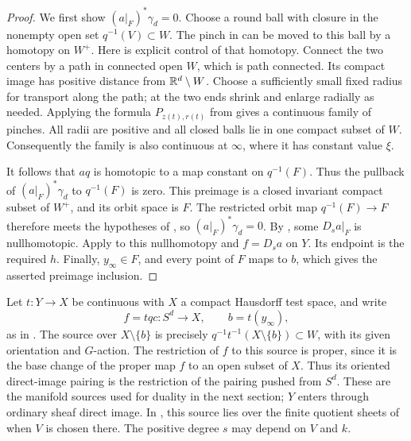 \begin{proof}
We first show $(a|_F)^*\gamma_d=0$.  Choose a round ball with
closure in the nonempty open set $q^{-1}(V)\subset W$.  The
pinch in  can be moved to this ball by a
homotopy on $W^+$.  Here is explicit control of that homotopy.
Connect the two centers by a path in connected open $W$, which
is path connected.  Its compact image has positive distance
from $\mathbb R^d\setminus W$.  Choose a sufficiently small fixed
radius for transport along the path; at the two ends shrink
and enlarge radially as needed.  Applying the formula
$P_{z(t),r(t)}$ from  gives a continuous
family of pinches.  All radii are positive and all closed balls
lie in one compact subset of $W$.  Consequently the family is
also continuous at $\infty$, where it has constant value $\xi$.

It follows that $aq$ is homotopic to a map constant on
$q^{-1}(F)$.  Thus the pullback of $(a|_F)^*\gamma_d$ to
$q^{-1}(F)$ is zero.  This preimage is a closed invariant compact
subset of $W^+$, and its orbit space is $F$.  The restricted orbit map
$q^{-1}(F)\to F$ therefore meets the hypotheses of
, so $(a|_F)^*\gamma_d=0$.
By , some $D_sa|_F$ is nullhomotopic.
Apply  to this nullhomotopy and
$f=D_sa$ on $Y$.  Its endpoint is the required $h$.  Finally,
$y_\infty\in F$, and every point of $F$ maps to $b$, which
gives the asserted preimage inclusion.
\end{proof}

\begin{remark}
\label{top:proper-test-interface}
Let $t:Y\to X$ be continuous with $X$ a compact Hausdorff test
space, and write
\[
 f=tqc:S^d\to X,\qquad b=t(y_\infty),
\]
as in . The source over $X\setminus\{b\}$ is precisely
$q^{-1}t^{-1}(X\setminus\{b\})\subset W$, with its given
orientation and $G$-action.  The restriction of $f$ to this
source is proper, since it is the base change of the proper
map $f$ to an open subset of $X$.  Thus its oriented
direct-image pairing is the restriction of the pairing pushed
from $S^d$.  These are the manifold sources used for duality
in the next section; $Y$ enters through ordinary sheaf direct
image.  In , this source lies over the
finite quotient sheets of  when $V$ is
chosen there.  The positive degree $s$ may depend on $V$ and
$k$.
\end{remark}

